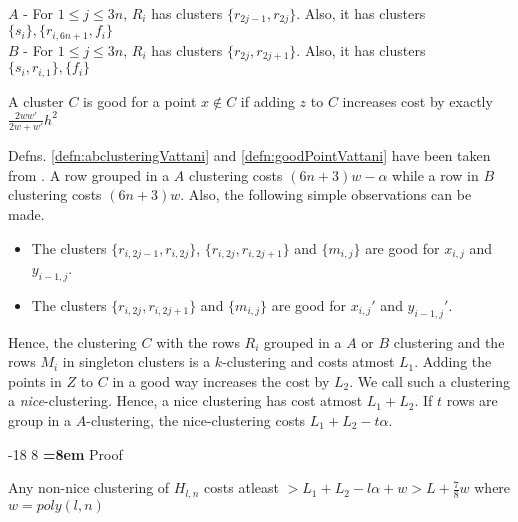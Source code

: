 \documentclass[orivec]{llncs}
\makeatletter
\renewcommand\subsubsection{\@startsection{subsubsection}{3}{\z@}%
   {-18\p@ \@plus -4\p@ \@minus -4\p@}%
   {8\p@ \@plus 4\p@ \@minus 4\p@}%
   {\normalfont\normalsize\bfseries\boldmath
   \rightskip=\z@ \@plus 8em \pretolerance=10000}}
\makeatother
\begin{document}
\begin{definition}
\label{defn:abclusteringVattani}
\noindent $A$ - For $1 \le j \le 3n$, $R_i$ has clusters $\{r_{2j-1}, r_{2j}\}$. Also, it has clusters $\{s_i\}, \{r_{i, 6n+1}, f_i\}$\\
\noindent $B$ - For $1 \le j \le 3n$, $R_i$ has clusters $\{r_{2j}, r_{2j+1}\}$. Also, it has clusters $\{s_i, r_{i, 1}\}, \{f_i\}$
\end{definition}

\begin{definition}
\label{defn:goodPointVattani}
A cluster $C$ is good for a point $x \not\in C$ if adding $z$ to $C$ increases cost by exactly $\frac{2ww'}{2w+w'}h^2$ 
\end{definition}

Defns. \ref{defn:abclusteringVattani} and \ref{defn:goodPointVattani} have been taken from \cite{vattani2009hardness}. A row grouped in a $A$ clustering costs $(6n+3)w-\alpha$ while a row in $B$ clustering costs $(6n+3)w$. Also, the following simple observations can be made. 
\begin{itemize}[nolistsep,noitemsep]
\item The clusters $\{r_{i,2j-1}, r_{i, 2j}\}$, $\{r_{i,2j}, r_{i, 2j+1}\}$ and $\{m_{i,j}\}$ are good for $x_{i,j}$ and $y_{i-1,j}$.
\item The clusters $\{r_{i,2j}, r_{i, 2j+1}\}$ and $\{m_{i,j}\}$ are good for $x_{i,j}'$ and $y_{i-1,j}'$.
\end{itemize}
Hence, the clustering $C$ with the rows $R_i$ grouped in a $A$ or $B$ clustering and the rows $M_i$ in singleton clusters is a $k$-clustering and costs atmost $L_1$. Adding the points in $Z$ to $C$ in a good way increases the cost by $L_2$. We call such a clustering a {\it nice}-clustering. Hence, a nice clustering has cost atmost $L_1 + L_2$. If $t$ rows are group in a $A$-clustering, the nice-clustering costs $L_1+L_2-t\alpha$.

\subsubsection{Proof}


\begin{lemma}
Any non-nice clustering of $H_{l, n}$ costs atleast $> L_1 + L_2 - l\alpha + w > L + \frac{7}{8}w$ where $w = poly(l, n)$
\end{lemma}
\end{document}
